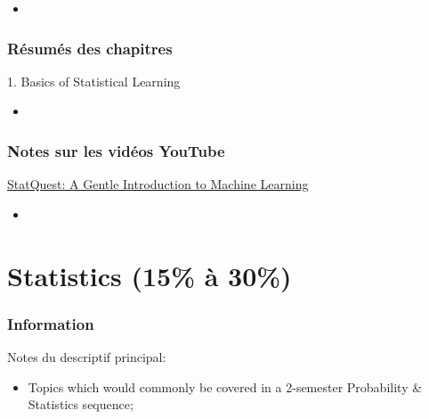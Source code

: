 \documentclass[12pt, titlepage, french]{report}
\begin{document}
\begin{YTB_vids}
\begin{itemize}
	\item	
\end{itemize}
\end{YTB_vids}

\subsection{Résumés des chapitres}

\begin{CHPT_SUMM}[label = {BASICS}]{1. Basics of Statistical Learning}
	\begin{itemize}
		\item	
	\end{itemize}
\end{CHPT_SUMM}

\subsection{Notes sur les vidéos YouTube}

\begin{YTB_SUMM}[label = {SQ-BASICS-ML-INTRO}]{\href{https://www.youtube.com/watch?v=Gv9_4yMHFhI&list=PLblh5JKOoLUICTaGLRoHQDuF_7q2GfuJF&index=2&t=0s}{StatQuest: A Gentle Introduction to Machine Learning}}
\begin{itemize}
	\item	
\end{itemize}
\end{YTB_SUMM}

\newpage

\chapter[Statistics]{Statistics (15\% à 30\%)}

\subsection{Information}

\begin{distributions}[Description]
Notes du descriptif principal:
\begin{itemize}
	\item	Topics which would commonly be covered in a 2-semester Probability \& Statistics sequence;
\end{itemize}
\end{distributions}
\end{document}
